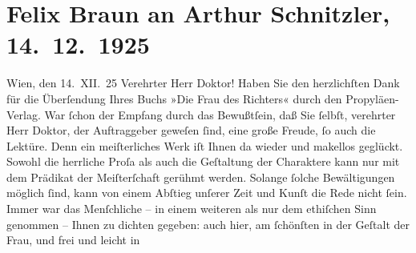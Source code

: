 

               \section[Felix Braun an Arthur Schnitzler, 14. 12. 1925]{ Felix Braun an Arthur Schnitzler, 14. 12. 1925}\nopagebreak{}\rehead{ }\begin{ledgroupsized}[t]{13cm}\normalsize\beginnumbering{} \toendnotes[C]{\smallbreak\pagebreak[2]} 
\toendnotes[C]{\smallbreak}\pstart
           \centering{}{\pb}Wien, den 14. XII. 25\pend
           \pstart{}Verehrter Herr Doktor!\pend\pstart
           Haben Sie den herzlichſten Dank für die Überſendung Ihres Buchs »Die Frau des Richters« durch den Propyläen-Verlag. War ſchon der Empfang durch das
                    Bewußtſein, daß Sie ſelbſt, verehrter Herr Doktor, der Auftraggeber geweſen
                    ſind, eine große Freude, ſo auch die Lektüre. Denn ein meiſterliches Werk iſt
                    Ihnen da wieder und makellos geglückt. Sowohl die herrliche Proſa als auch die
                    Geſtaltung der Charaktere kann nur mit dem Prädikat der Meiſter{\pb}ſchaft gerühmt werden. Solange ſolche Bewältigungen möglich ſind, kann von
                    einem Abſtieg unſerer Zeit und Kunſt die Rede nicht ſein.\pend
           \pstart
           Immer war das Menſchliche – in einem weiteren als nur dem ethiſchen Sinn genommen
                    – Ihnen zu dichten gegeben: auch hier, am ſchönſten in der Geſtalt der Frau, und frei und leicht in

\end{ledgroupsized}
